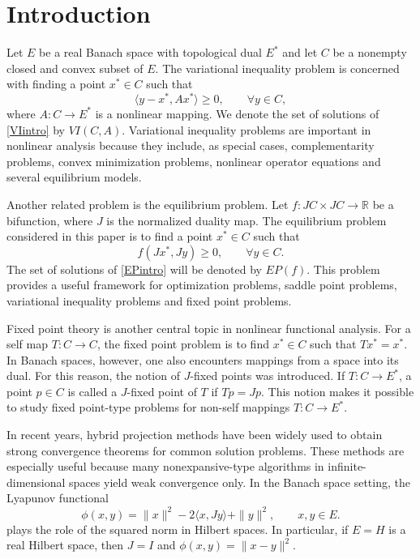 \documentclass[leqno,12pt]{amsart}
\theoremstyle{definition}
\numberwithin{equation}{section}
\begin{document}
\section{Introduction}

Let $E$ be a real Banach space with topological dual $E^{*}$ and let $C$ be a nonempty closed and convex subset of $E$. The variational inequality problem is concerned with finding a point $x^{*}\in C$ such that
\begin{equation}\label{VIintro}
\langle y-x^{*},Ax^{*}\rangle\geq 0,\qquad \forall y\in C,
\end{equation}
where $A:C\to E^{*}$ is a nonlinear mapping. We denote the set of solutions of \eqref{VIintro} by $VI(C,A)$. Variational inequality problems are important in nonlinear analysis because they include, as special cases, complementarity problems, convex minimization problems, nonlinear operator equations and several equilibrium models.

Another related problem is the equilibrium problem. Let $f:JC\times JC\to \mathbb{R}$ be a bifunction, where $J$ is the normalized duality map. The equilibrium problem considered in this paper is to find a point $x^{*}\in C$ such that
\begin{equation}\label{EPintro}
f(Jx^{*},Jy)\geq 0,\qquad \forall y\in C.
\end{equation}
The set of solutions of \eqref{EPintro} will be denoted by $EP(f)$. This problem provides a useful framework for optimization problems, saddle point problems, variational inequality problems and fixed point problems.

Fixed point theory is another central topic in nonlinear functional analysis. For a self map $T:C\to C$, the fixed point problem is to find $x^{*}\in C$ such that $Tx^{*}=x^{*}$. In Banach spaces, however, one also encounters mappings from a space into its dual. For this reason, the notion of $J$-fixed points was introduced. If $T:C\to E^{*}$, a point $p\in C$ is called a $J$-fixed point of $T$ if $Tp=Jp$. This notion makes it possible to study fixed point-type problems for non-self mappings $T:C\to E^{*}$.

In recent years, hybrid projection methods have been widely used to obtain strong convergence theorems for common solution problems. These methods are especially useful because many nonexpansive-type algorithms in infinite-dimensional spaces yield weak convergence only. In the Banach space setting, the Lyapunov functional
\begin{equation}\label{phi}
\phi(x,y)=\|x\|^{2}-2\langle x,Jy\rangle+\|y\|^{2},\qquad x,y\in E.
\end{equation}
plays the role of the squared norm in Hilbert spaces. In particular, if $E=H$ is a real Hilbert space, then $J=I$ and $\phi(x,y)=\|x-y\|^{2}$.
\end{document}
